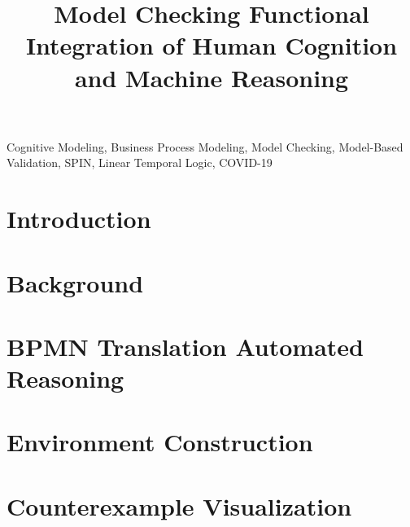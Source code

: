 \documentclass[conference]{IEEEtran}
\begin{document}
\title{
  Model Checking Functional Integration of Human Cognition and Machine Reasoning
}

\author{
\and
{}
}

\maketitle

\begin{abstract}
    
\end{abstract}

\begin{IEEEkeywords}
    Cognitive Modeling, Business Process Modeling, Model Checking, Model-Based Validation, SPIN, Linear Temporal Logic, COVID-19
\end{IEEEkeywords}

\section{Introduction}


\section{Background}
\label{sec:background}


\section{BPMN Translation Automated Reasoning}
\label{sec:bpmnReasoning}


\section{Environment Construction}
\label{sec:envConstruction}


\section{Counterexample Visualization}
\label{sec:counterexample}

\end{document}

